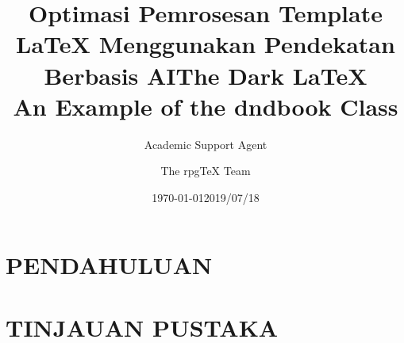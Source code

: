 \documentclass{dndbook}
\title{Optimasi Pemrosesan Template LaTeX Menggunakan Pendekatan Berbasis AI}
\author{Academic Support Agent}
\date{\today}
\begin{document}
\maketitle

\begin{abstract}

\end{abstract}

\chapter{PENDAHULUAN}


\chapter{TINJAUAN PUSTAKA}



\usepackage[english]{babel}

\usepackage[utf8]{inputenc}
\usepackage[singlelinecheck=false]{caption}
\usepackage{lipsum}
\usepackage{listings}
\usepackage{shortvrb}
\usepackage{stfloats}


\MakeShortVerb{|}


\title{The Dark \LaTeX{} \\
\large An Example of the dndbook Class}
\author{The rpgTeX Team}
\date{2019/07/18}
\end{document}
